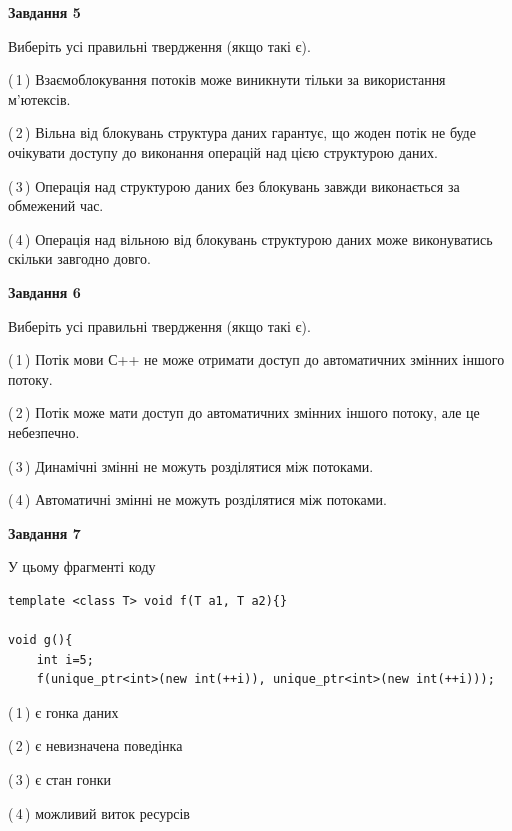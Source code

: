 \documentclass[12pt, ukrainian]{article}
\begin{document}
\begin {large}
{\begin{center}
\textbf{Завдання 5}
\end{center}

Виберіть усі правильні твердження (якщо такі є).\par
\vspace{2mm}

(\,1\,) Взаємоблокування потоків може виникнути тільки за використання м’ютексів.%

(\,2\,) Вільна від блокувань структура даних гарантує, що жоден потік не буде очікувати доступу до виконання операцій над цією структурою даних.%

(\,3\,) Операція над структурою даних без блокувань завжди виконається за обмежений час.%

(\,4\,) Операція над вільною від блокувань структурою даних може виконуватись скільки завгодно довго.%
\newpage


\begin{center}
\textbf{Завдання 6}
\end{center}

Виберіть усі правильні твердження (якщо такі є).\par
\vspace{2mm}

(\,1\,) Потік мови С++ не може отримати доступ до автоматичних змінних іншого потоку.%

(\,2\,) Потік може мати доступ до автоматичних змінних іншого потоку, але це небезпечно.%

(\,3\,) Динамічні змінні не можуть розділятися між потоками.%

(\,4\,) Автоматичні змінні не можуть розділятися між потоками.%


\begin{center}
\textbf{Завдання 7}
\end{center}

У цьому фрагменті коду
\begin{verbatim}
template <class T> void f(T a1, T a2){}

void g(){
    int i=5;
    f(unique_ptr<int>(new int(++i)), unique_ptr<int>(new int(++i)));
\end{verbatim}

(\,1\,) є гонка даних%

(\,2\,) є невизначена поведінка%

(\,3\,) є стан гонки%

(\,4\,) можливий виток ресурсів%

}
\end {large}

\vspace{4mm}
\newpage
\end{document}
